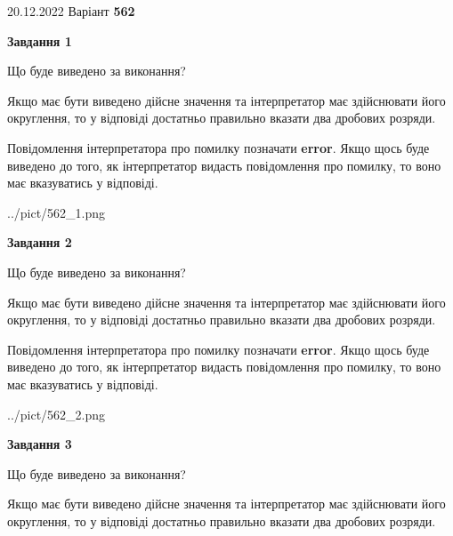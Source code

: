 \documentclass[12pt, ukrainian]{article}
\begin{document}
{20.12.2022 Варіант \No \textbf { 562 }\par}
{
\begin {Large}

{\begin {center}\textbf{Завдання 1}\end {center}}\par
Що буде виведено за виконання? \par

Якщо має бути виведено дійсне значення та інтерпретатор має здійснювати його округлення, 
то у відповіді достатньо правильно вказати два дробових розряди.

Повідомлення інтерпретатора про помилку позначати \textbf{error}.
Якщо щось буде виведено до того, як інтерпретатор видасть повідомлення про помилку, 
то воно має вказуватись у відповіді. \par

\begin{center}
	{../pict/562_1.png}
\end{center}
\newpage

{\begin {center}\textbf{Завдання 2}\end {center}}\par
Що буде виведено за виконання? \par

Якщо має бути виведено дійсне значення та інтерпретатор має здійснювати його округлення, 
то у відповіді достатньо правильно вказати два дробових розряди.

Повідомлення інтерпретатора про помилку позначати \textbf{error}.
Якщо щось буде виведено до того, як інтерпретатор видасть повідомлення про помилку, 
то воно має вказуватись у відповіді. \par

\begin{center}
	{../pict/562_2.png}
\end{center}
\newpage

{\begin {center}\textbf{Завдання 3}\end {center}}\par
Що буде виведено за виконання? \par

Якщо має бути виведено дійсне значення та інтерпретатор має здійснювати його округлення, 
то у відповіді достатньо правильно вказати два дробових розряди.


\end{Large}}
\end{document}
